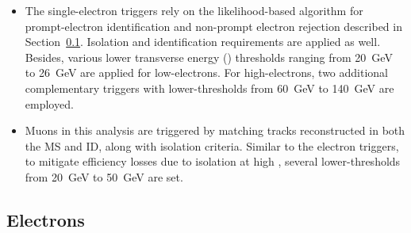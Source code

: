 \begin{itemize}
	\item The single-electron triggers rely on the likelihood-based algorithm for prompt-electron 
	identification and non-prompt electron rejection described in Section~\ref{sec:ChaptH:ObjectDefReco:electron}.
	Isolation and identification requirements are applied as well.  
	Besides, various lower transverse energy (\ET) thresholds ranging from 20~GeV to 26~GeV 
	are applied for low-\pT electrons. 
	For high-\pT electrons, two additional complementary triggers with lower-\ET thresholds 
	from 60~GeV to 140~GeV are employed. 
	
	\item Muons in this analysis are triggered by matching tracks reconstructed in both the MS and ID,
	along with isolation criteria. Similar to the electron triggers, to mitigate efficiency losses due to 
	isolation at high \pT, several lower-\pT thresholds from 20~GeV to 50~GeV are set.
\end{itemize}




%
%
\subsection{Electrons}
\label{sec:ChaptH:ObjectDefReco:electron}

